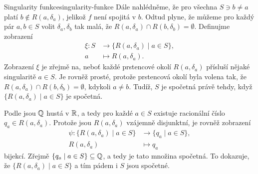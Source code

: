 \begin{example}{Singularity funkce}{singularity-funkce}
 Dále nahlédněme, že pro všechna $S \ni b \neq a$ platí $b \notin
 R(a,\delta_a)$, jelikož $f$ není spojitá v $b$. Odtud plyne, že můžeme pro
 každý pár $a,b \in S$ volit $\delta_a,\delta_b$ tak malá, že $R(a,\delta_a)
 \cap R(b,\delta_b) = \emptyset$. Definujme zobrazení
 \begin{align*}
  \xi: S &\to \{R(a,\delta_a) \mid a \in S\},\\
  a &\mapsto R(a,\delta_a).
 \end{align*}
 Zobrazení $\xi$ je zřejmě na, neboť každé prstencové okolí $R(a,\delta_a)$
 přísluší nějaké singularitě $a \in S$. Je rovněž prosté, protože prstencová
 okolí byla volena tak, že $R(a,\delta_a) \cap R(b,\delta_b) = \emptyset$,
 kdykoli $a \neq b$. Tudíž, $S$ je spočetná právě tehdy, když $\{R(a,\delta_a)
 \mid a \in S\}$ je spočetná.

 Podle  jsou $\mathbb{Q}$ hustá v $\mathbb{R}$, a tedy pro
 každé $a \in S$ existuje racionální číslo $q_a \in R(a,\delta_a)$. Protože jsou
 $R(a,\delta_a)$ vzájemně disjunktní, je rovněž zobrazení
 \begin{align*}
  \psi: \{R(a,\delta_a) \mid a \in S\} &\to \{q_a \mid a \in S\},\\
  R(a,\delta_a) & \mapsto q_a
 \end{align*}
 bijekcí. Zřejmě $\{q_a \mid a \in S\} \subseteq \mathbb{Q}$, a tedy je tato množina
 spočetná. To dokazuje, že $\{R(a,\delta_a) \mid a \in S\}$ a tím pádem i $S$
 jsou spočetné.
\end{example}

